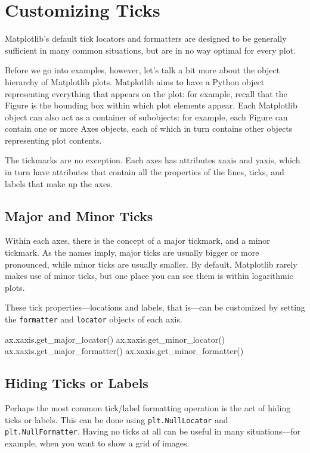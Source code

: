 \chapter{Customizing Ticks\label{}}
Matplotlib's default tick locators and formatters are designed to be generally sufficient
in many common situations, but are in no way optimal for every plot.

Before we go into examples, however, let's talk a bit more about the object hierarchy
of Matplotlib plots. Matplotlib aims to have a Python object representing everything
that appears on the plot: for example, recall that the Figure is the bounding box
within which plot elements appear. Each Matplotlib object can also act as a container
of subobjects: for example, each Figure can contain one or more Axes objects, each
of which in turn contains other objects representing plot contents.

The tickmarks are no exception. Each axes has attributes xaxis and yaxis, which in
turn have attributes that contain all the properties of the lines, ticks, and labels that
make up the axes.
\section{Major and Minor Ticks}
Within each axes, there is the concept of a major tickmark, and a minor tickmark. As
the names imply, major ticks are usually bigger or more pronounced, while minor
ticks are usually smaller. By default, Matplotlib rarely makes use of minor ticks, but
one place you can see them is within logarithmic plots.


These tick properties—locations and labels, that is—can be customized by setting the
\verb|formatter| and \verb|locator| objects of each axis.



\begin{pyc}
    ax.xaxis.get_major_locator()
    ax.xaxis.get_minor_locator()
    ax.xaxis.get_major_formatter()
    ax.xaxis.get_minor_formatter()
\end{pyc}

\section{Hiding Ticks or Labels}
Perhaps the most common tick/label formatting operation is the act of hiding ticks or
labels. This can be done using \verb|plt.NullLocator| and \verb|plt.NullFormatter|. Having no ticks at
all can be useful in many situations—for example, when you want to show a grid of
images.

